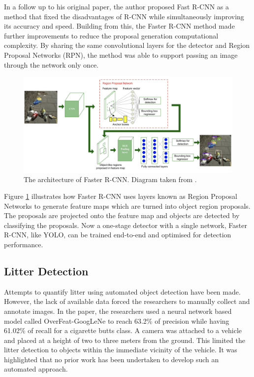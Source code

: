 \documentclass{thesis}
\begin{document}
In a follow up to his original paper, the author proposed Fast R-CNN as a method that fixed the disadvantages of R-CNN while simultaneously improving its accuracy and speed\cite{fast-rcnn}. Building from this, the Faster R-CNN method made further improvements to reduce the proposal generation computational complexity. By sharing the same convolutional layers for the detector and Region Proposal Networks (RPN), the method was able to support passing an image through the network only once\cite{frcnn}.

\begin{figure}[h]
    \centering
    \includegraphics[scale=0.5]{images/faster-rcnn-architecture.png}
    \caption{The architecture of Faster R-CNN. Diagram taken from \cite{smart-street}.}
    \label{fig:faster-rcnn-architecture}
\end{figure}

Figure \ref{fig:faster-rcnn-architecture} illustrates how Faster R-CNN uses layers known as Region Proposal Networks to generate feature maps which are turned into object region proposals. The proposals are projected onto the feature map and objects are detected by classifying the proposals. Now a one-stage detector with a single network, Faster R-CNN, like YOLO\cite{yolov1}, can be trained end-to-end and optimised for detection performance.

\subsection{Litter Detection}

Attempts to quantify litter using automated object detection have been made\cite{cvstreets}. However, the lack of available data forced the researchers to manually collect and annotate images. In the paper, the researchers used a neural network based model called OverFeat-GoogLeNe to reach 63.2\% of precision while having 61.02\% of recall for a cigarette butts class. A camera was attached to a vehicle and placed at a height of two to three meters from the ground. This limited the litter detection to objects within the immediate vicinity of the vehicle. It was highlighted that no prior work has been undertaken to develop such an automated approach.
\end{document}
